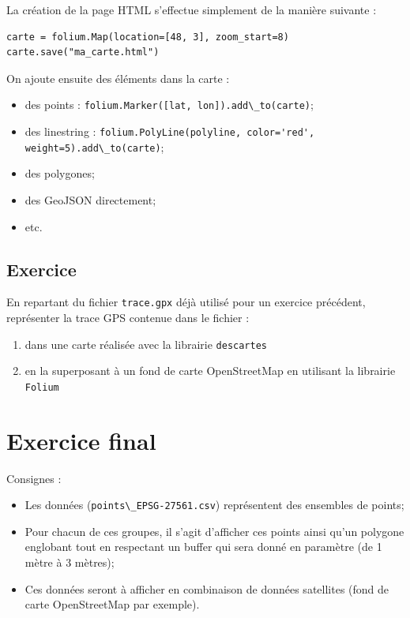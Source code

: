 \documentclass[11pt]{article}
\newcommand{\passthrough}[1]{#1}
\def\tightlist{}
\begin{document}
La création de la page HTML s'effectue simplement de la manière suivante
:

\begin{lstlisting}
carte = folium.Map(location=[48, 3], zoom_start=8)
carte.save("ma_carte.html")
\end{lstlisting}

On ajoute ensuite des éléments dans la carte :

\begin{itemize}
\tightlist
\item
  des points :
  \passthrough{\lstinline!folium.Marker([lat, lon]).add\_to(carte)!};
\item
  des linestring :
  \passthrough{\lstinline!folium.PolyLine(polyline, color='red', weight=5).add\_to(carte)!};
\item
  des polygones;
\item
  des GeoJSON directement;
\item
  etc.
\end{itemize}

\hypertarget{exercice}{%
\subsection{Exercice}\label{exercice}}

En repartant du fichier \passthrough{\lstinline!trace.gpx!} déjà utilisé
pour un exercice précédent, représenter la trace GPS contenue dans le
fichier :

\begin{enumerate}
\def\labelenumi{\arabic{enumi}.}
\tightlist
\item
  dans une carte réalisée avec la librairie
  \passthrough{\lstinline!descartes!}
\item
  en la superposant à un fond de carte OpenStreetMap en utilisant la
  librairie \passthrough{\lstinline!Folium!}
\end{enumerate}

\hypertarget{exercice-final}{%
\section{Exercice final}\label{exercice-final}}

Consignes :

\begin{itemize}
\tightlist
\item
  Les données (\passthrough{\lstinline!points\_EPSG-27561.csv!})
  représentent des ensembles de points;
\item
  Pour chacun de ces groupes, il s'agit d'afficher ces points ainsi
  qu'un polygone englobant tout en respectant un buffer qui sera donné
  en paramètre (de 1 mètre à 3 mètres);
\item
  Ces données seront à afficher en combinaison de données satellites
  (fond de carte OpenStreetMap par exemple).
\end{itemize}
\end{document}
